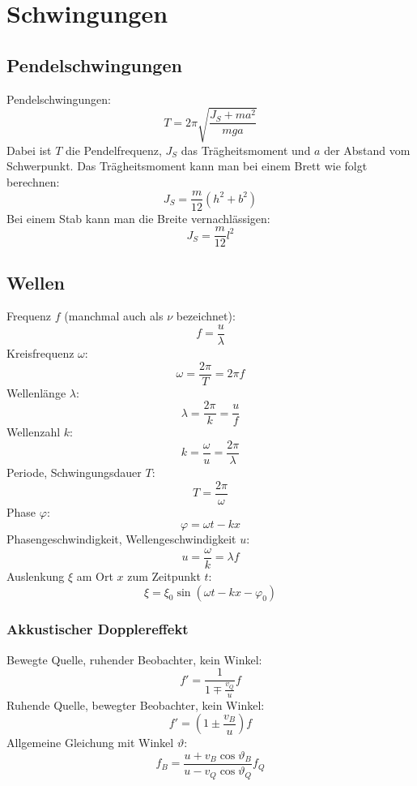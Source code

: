 \section{Schwingungen}

\subsection{Pendelschwingungen}

Pendelschwingungen:
\[
	T = 2 \pi \sqrt{\frac{J_S + ma^2}{mga}}	
\]
Dabei ist $T$ die Pendelfrequenz, $J_S$ das Trägheitsmoment und $a$ der Abstand
vom Schwerpunkt. Das Trägheitsmoment kann man bei einem Brett wie folgt
berechnen:
\[
	J_S = \frac{m}{12} \left(h^2 + b^2\right)
\]
Bei einem Stab kann man die Breite vernachlässigen:
\[
	J_S = \frac{m}{12} l^2
\]

\subsection{Wellen}



Frequenz $f$ (manchmal auch als $\nu$ bezeichnet):
\[
	f = \frac{u}{\lambda}
\]
Kreisfrequenz $\omega$:
\[
	\omega = \frac{2 \pi}{T} = 2 \pi f
\]
Wellenlänge $\lambda$:
\[
	\lambda = \frac{2 \pi}{k} = \frac{u}{f}
\]
Wellenzahl $k$:
\[
k = \frac{\omega}{u} = \frac{2 \pi}{\lambda}
\]
Periode, Schwingungsdauer $T$:
\[
	T = \frac{2 \pi}{\omega}
\]
Phase $\varphi$:
\[
	\varphi = \omega t - k x
\]
Phasengeschwindigkeit, Wellengeschwindigkeit $u$:
\[
	u = \frac{\omega}{k} = \lambda f
\]
Auslenkung $\xi$ am Ort $x$ zum Zeitpunkt $t$:
\[
	\xi = \xi_0 \sin (\omega t - k x - \varphi_0)
\]

\subsubsection{Akkustischer Dopplereffekt}

Bewegte Quelle, ruhender Beobachter, kein Winkel:
\[
	f' = \frac{1}{1 \mp \frac{v_Q}{u}} f
\]
Ruhende Quelle, bewegter Beobachter, kein Winkel:
\[
	f' = (1 \pm \frac{v_B}{u}) f
\]
Allgemeine Gleichung mit Winkel $\vartheta$:
\[
	f_B = \frac{u + v_B \cos \vartheta_B}{u - v_Q \cos \vartheta_Q} f_Q
\]
